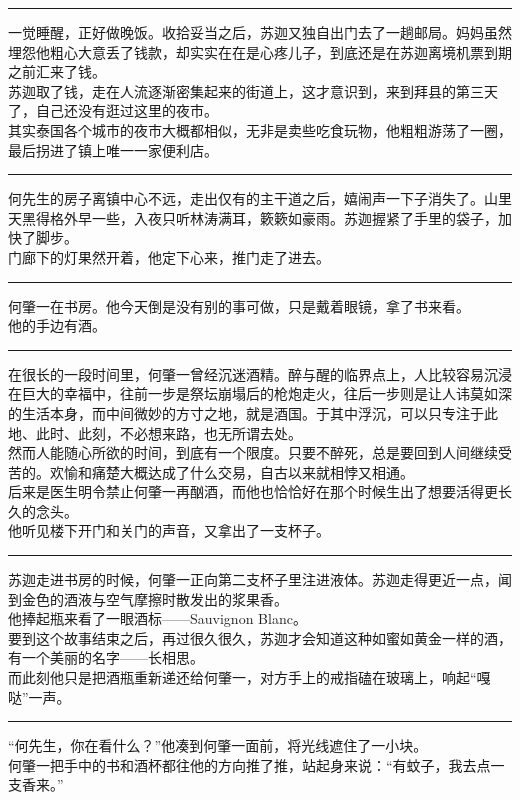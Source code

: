 \documentclass[oneside,11pt]{memoir} %
\begin{document}
\begin{CJK}{UTF8}{gbsn}
\rule{-3pt}{30pt}
    一觉睡醒，正好做晚饭。收拾妥当之后，苏迦又独自出门去了一趟邮局。妈妈虽然埋怨他粗心大意丢了钱款，却实实在在是心疼儿子，到底还是在苏迦离境机票到期之前汇来了钱。\\\indent
    苏迦取了钱，走在人流逐渐密集起来的街道上，这才意识到，来到拜县的第三天了，自己还没有逛过这里的夜市。\\\indent
    其实泰国各个城市的夜市大概都相似，无非是卖些吃食玩物，他粗粗游荡了一圈，最后拐进了镇上唯一一家便利店。\\\indent
\rule{-3pt}{30pt}
    何先生的房子离镇中心不远，走出仅有的主干道之后，嬉闹声一下子消失了。山里天黑得格外早一些，入夜只听林涛满耳，簌簌如豪雨。苏迦握紧了手里的袋子，加快了脚步。\\\indent
    门廊下的灯果然开着，他定下心来，推门走了进去。\\\indent
\rule{-3pt}{30pt}
    何肇一在书房。他今天倒是没有别的事可做，只是戴着眼镜，拿了书来看。\\\indent
    他的手边有酒。\\\indent
\rule{-3pt}{30pt}
    在很长的一段时间里，何肇一曾经沉迷酒精。醉与醒的临界点上，人比较容易沉浸在巨大的幸福中，往前一步是祭坛崩塌后的枪炮走火，往后一步则是让人讳莫如深的生活本身，而中间微妙的方寸之地，就是酒国。于其中浮沉，可以只专注于此地、此时、此刻，不必想来路，也无所谓去处。\\\indent
    然而人能随心所欲的时间，到底有一个限度。只要不醉死，总是要回到人间继续受苦的。欢愉和痛楚大概达成了什么交易，自古以来就相悖又相通。\\\indent
    后来是医生明令禁止何肇一再酗酒，而他也恰恰好在那个时候生出了想要活得更长久的念头。\\\indent
    他听见楼下开门和关门的声音，又拿出了一支杯子。\\\indent
\rule{-3pt}{30pt}
    苏迦走进书房的时候，何肇一正向第二支杯子里注进液体。苏迦走得更近一点，闻到金色的酒液与空气摩擦时散发出的浆果香。\\\indent
    他捧起瓶来看了一眼酒标——Sauvignon Blanc。\\\indent
    要到这个故事结束之后，再过很久很久，苏迦才会知道这种如蜜如黄金一样的酒，有一个美丽的名字——长相思。\\\indent
    而此刻他只是把酒瓶重新递还给何肇一，对方手上的戒指磕在玻璃上，响起“嘎哒”一声。\\\indent
\rule{-3pt}{30pt}
    “何先生，你在看什么？”他凑到何肇一面前，将光线遮住了一小块。\\\indent
    何肇一把手中的书和酒杯都往他的方向推了推，站起身来说：“有蚊子，我去点一支香来。”\\\indent

\end{CJK}
\end{document}
